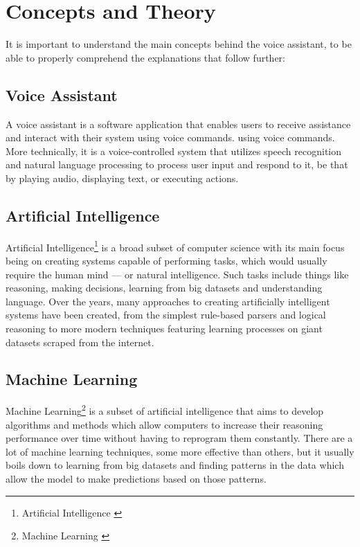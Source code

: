 \cleardoubleemptypage
\renewcommand*\chapterpagestyle{scrheadings}

\chapter{Concepts and Theory}
It is important to understand the main concepts behind the voice assistant,
to be able to properly comprehend the explanations that follow further:

\section{Voice Assistant}
A voice assistant is a software application that enables users to receive assistance and interact with their system using voice commands.
using voice commands. More technically, it is a voice-controlled system that utilizes speech recognition and
natural language processing to process user input and respond to it,
be that by playing audio, displaying text, or executing actions.

\section{Artificial Intelligence}
Artificial Intelligence\footnote{Artificial Intelligence \cite{ai}} is a broad subset of computer science
with its main focus being on creating systems capable of performing tasks,
which would usually require the human mind --- or natural intelligence.
Such tasks include things like reasoning, making decisions, learning from big datasets and understanding language.
Over the years, many approaches to creating artificially intelligent systems have been created,
from the simplest rule-based parsers and logical reasoning to more modern techniques
featuring learning processes on giant datasets scraped from the internet.

\section{Machine Learning}
Machine Learning\footnote{Machine Learning \cite{ml}} is a subset of artificial intelligence  
that aims to develop algorithms and methods which allow computers to increase
their reasoning performance over time without having to reprogram them constantly.
There are a lot of machine learning techniques, some more effective than others,
but it usually boils down to learning from big datasets and finding
patterns in the data which allow the model to make predictions based on those patterns.

